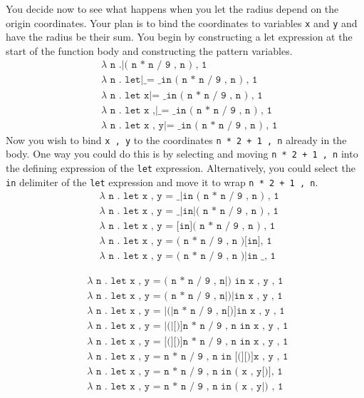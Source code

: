 You decide now to see what happens when you let the
radius depend on the origin coordinates.
Your plan is to bind the coordinates to variables
\texttt{x} and \texttt{y} and have the radius be their sum.
You begin by constructing a let expression at the start
of the function body and constructing the pattern variables.
\begin{align*}
  & \texttt{$\lambda$ n .|( n * n / 9 , n ) , 1} \\
  & \texttt{$\lambda$ n . let|\_ = \_ in ( n * n / 9 , n ) , 1} \\
  & \texttt{$\lambda$ n . let x|= \_ in ( n * n / 9 , n ) , 1} \\
  & \texttt{$\lambda$ n . let x ,|\_ = \_ in ( n * n / 9 , n ) , 1} \\
  & \texttt{$\lambda$ n . let x , y|= \_ in ( n * n / 9 , n ) , 1}
\end{align*}
Now you wish to bind \texttt{x , y} to the coordinates
\texttt{n * 2 + 1 , n} already in the body.
One way you could do this is by selecting and moving
\texttt{n * 2 + 1 , n} into the defining expression of
the \texttt{let} expression.
Alternatively, you could select the \texttt{in} delimiter
of the \texttt{let} expression and move it to wrap
\texttt{n * 2 + 1 , n}.
\begin{align*}
  & \texttt{$\lambda$ n . let x , y = \_|in ( n * n / 9 , n ) , 1} \\
  & \texttt{$\lambda$ n . let x , y = \_|in|( n * n / 9 , n ) , 1} \\
  & \texttt{$\lambda$ n . let x , y = [in]( n * n / 9 , n ) , 1} \\
  & \texttt{$\lambda$ n . let x , y = ( n * n / 9 , n )[in], 1} \\
  & \texttt{$\lambda$ n . let x , y = ( n * n / 9 , n )|in \_ , 1}
\end{align*}

\begin{align*}
  & \texttt{$\lambda$ n . let x , y = ( n * n / 9 , n|) in x , y , 1 } \\
  & \texttt{$\lambda$ n . let x , y = ( n * n / 9 , n|)|in x , y , 1 } \\
  & \texttt{$\lambda$ n . let x , y = |(|n * n / 9 , n[)]in x , y , 1 } \\
  & \texttt{$\lambda$ n . let x , y = |(|[)]n * n / 9 , n in x , y , 1 } \\
  & \texttt{$\lambda$ n . let x , y = [(][)]n * n / 9 , n in x , y , 1 } \\
  & \texttt{$\lambda$ n . let x , y = n * n / 9 , n in [(][)]x , y , 1 } \\
  & \texttt{$\lambda$ n . let x , y = n * n / 9 , n in ( x , y[)], 1 } \\
  & \texttt{$\lambda$ n . let x , y = n * n / 9 , n in ( x , y|) , 1 }
\end{align*}

